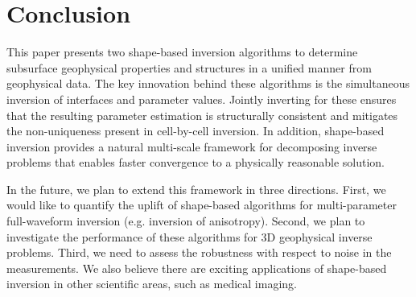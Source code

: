 \documentclass[manuscript,revised]{geophysics}
\begin{document}
\section{Conclusion}
This paper presents two shape-based inversion algorithms to determine subsurface geophysical properties and structures in a unified manner from geophysical data. The key innovation behind these algorithms is the simultaneous inversion of interfaces and parameter values.  Jointly inverting for these ensures that the resulting parameter estimation is structurally consistent and mitigates the non-uniqueness present in cell-by-cell inversion. In addition, shape-based inversion provides a natural multi-scale framework for decomposing inverse problems that enables faster convergence to a physically reasonable solution.  

In the future, we plan to extend this framework in three directions.  First, we would like to quantify the uplift of shape-based algorithms for multi-parameter full-waveform inversion (e.g. inversion of anisotropy).  Second, we plan to investigate the performance of these algorithms for 3D geophysical inverse problems.  Third, we need to assess the robustness with respect to noise in the measurements. We also believe there are exciting applications of shape-based inversion in other scientific areas, such as medical imaging.



\newpage
 


\newpage
\listoffigures
\newpage
\end{document}
